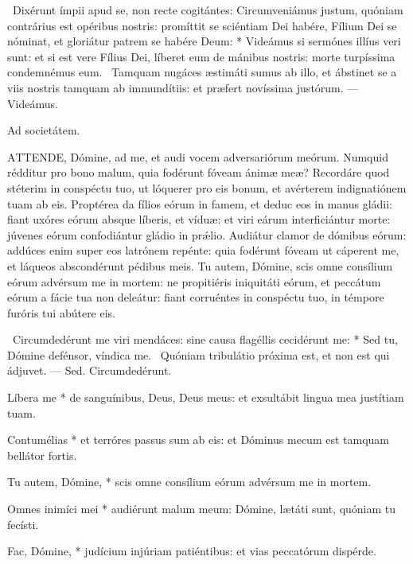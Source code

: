 \R\ Dixérunt ímpii apud se, non recte cogitántes: Circumveniámus justum, quóniam contrárius est opéribus nostris: promíttit se sciéntiam Dei habére, Fílium Dei se nóminat, et gloriátur patrem se habére Deum: * Videámus si sermónes illíus veri sunt: et si est vere Fílius Dei, líberet eum de mánibus nostris: morte turpíssima condemnémus eum. \V\ Tamquam nugáces æstimáti sumus ab illo, et ábstinet se a viis nostris tamquam ab immundítiis: et præfert novíssima justórum. --- Videámus.

 Ad societátem.


\lettrine[lines=2]{A}{TTENDE}, Dómine, ad me, et audi vocem adversariórum meórum. Numquid rédditur pro bono malum, quia fodérunt fóveam ánimæ meæ? Recordáre quod stéterim in conspéctu tuo, ut lóquerer pro eis bonum, et avérterem indignatiónem tuam ab eis. Proptérea da fílios eórum in famem, et deduc eos in manus gládii: fiant uxóres eórum absque líberis, et víduæ: et viri eárum interficiántur morte: júvenes eórum confodiántur gládio in prǽlio. Audiátur clamor de dómibus eórum: addúces enim super eos latrónem repénte: quia fodérunt fóveam ut cáperent me, et láqueos abscondérunt pédibus meis. Tu autem, Dómine, scis omne consílium eórum advérsum me in mortem: ne propitiéris iniquitáti eórum, et peccátum eórum a fácie tua non deleátur: fiant corruéntes in conspéctu tuo, in témpore furóris tui abútere eis.

\R\ Circumdedérunt me viri mendáces: sine causa flagéllis cecidérunt me: * Sed tu, Dómine defénsor, víndica me. \V\ Quóniam tribulátio próxima est, et non est qui ádjuvet. --- Sed. Circumdedérunt.



 Líbera me * de sanguínibus, Deus, Deus meus: et exsultábit lingua mea justítiam tuam.


 Contumélias * et terróres passus sum ab eis: et Dóminus mecum est tamquam bellátor fortis.

 Tu autem, Dómine, * scis omne consílium eórum advérsum me in mortem.

 Omnes inimíci mei * audiérunt malum meum: Dómine, lætáti sunt, quóniam tu fecísti.

 Fac, Dómine, * judícium injúriam patiéntibus: et vias peccatórum dispérde.

